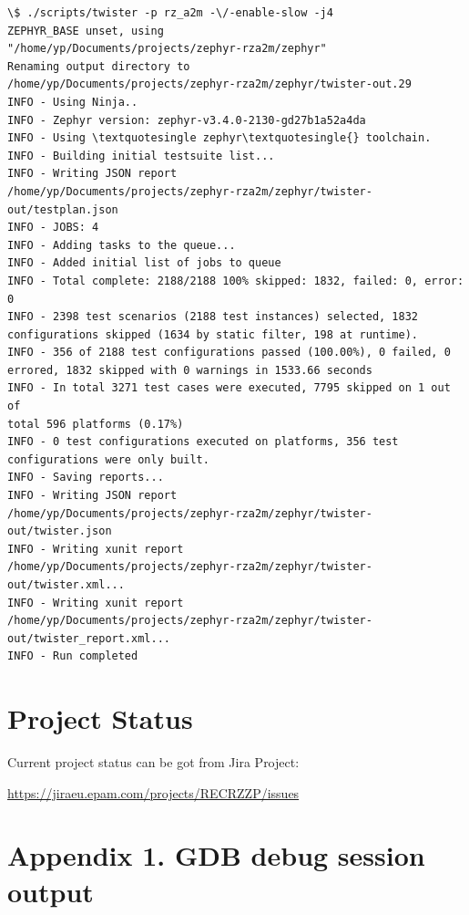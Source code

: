 \documentclass[11pt,a4paper,oneside]{article}
\begin{document}
\begin{lstlisting}
\$ ./scripts/twister -p rz_a2m -\/-enable-slow -j4
ZEPHYR_BASE unset, using
"/home/yp/Documents/projects/zephyr-rza2m/zephyr"
Renaming output directory to
/home/yp/Documents/projects/zephyr-rza2m/zephyr/twister-out.29
INFO - Using Ninja..
INFO - Zephyr version: zephyr-v3.4.0-2130-gd27b1a52a4da
INFO - Using \textquotesingle zephyr\textquotesingle{} toolchain.
INFO - Building initial testsuite list...
INFO - Writing JSON report
/home/yp/Documents/projects/zephyr-rza2m/zephyr/twister-out/testplan.json
INFO - JOBS: 4
INFO - Adding tasks to the queue...
INFO - Added initial list of jobs to queue
INFO - Total complete: 2188/2188 100% skipped: 1832, failed: 0, error:
0
INFO - 2398 test scenarios (2188 test instances) selected, 1832
configurations skipped (1634 by static filter, 198 at runtime).
INFO - 356 of 2188 test configurations passed (100.00%), 0 failed, 0
errored, 1832 skipped with 0 warnings in 1533.66 seconds
INFO - In total 3271 test cases were executed, 7795 skipped on 1 out of
total 596 platforms (0.17%)
INFO - 0 test configurations executed on platforms, 356 test
configurations were only built.
INFO - Saving reports...
INFO - Writing JSON report
/home/yp/Documents/projects/zephyr-rza2m/zephyr/twister-out/twister.json
INFO - Writing xunit report
/home/yp/Documents/projects/zephyr-rza2m/zephyr/twister-out/twister.xml...
INFO - Writing xunit report
/home/yp/Documents/projects/zephyr-rza2m/zephyr/twister-out/twister_report.xml...
INFO - Run completed
\end{lstlisting}

\section{Project Status}\label{project-status}

Current project status can be got from Jira Project:

\url{https://jiraeu.epam.com/projects/RECRZZP/issues}

\section*{Appendix 1. GDB debug session
output}\label{appendix-1.-gdb-debug-session-output}
\end{document}
